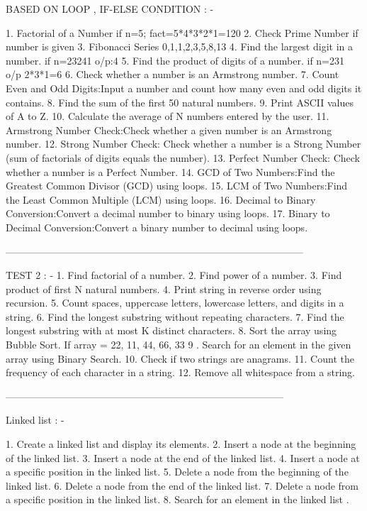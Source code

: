  BASED ON  LOOP , IF-ELSE CONDITION  : -
 
1.  Factorial of a Number if n=5;  fact=5*4*3*2*1=120
2.  Check Prime Number if number is given
3.  Fibonacci Series 0,1,1,2,3,5,8,13
4.  Find the largest digit in a number.   if n=23241   o/p:4
5.  Find the product of digits of a number. if n=231 o/p 2*3*1=6 
6.  Check whether a number is an Armstrong number.
7.  Count Even and Odd Digits:Input a number and count how many even and odd digits it contains.
8.  Find the sum of the first 50 natural numbers.
9.  Print ASCII values of A to Z.
10. Calculate the average of N numbers entered by the user.
11. Armstrong Number Check:Check whether a given number is an Armstrong number.
12. Strong Number Check: Check whether a number is a Strong Number (sum of factorials of digits equals the number).
13. Perfect Number Check: Check whether a number is a Perfect Number.
14. GCD of Two Numbers:Find the Greatest Common Divisor (GCD) using loops.
15. LCM of Two Numbers:Find the Least Common Multiple (LCM) using loops.
16. Decimal to Binary Conversion:Convert a decimal number to binary using loops.
17. Binary to Decimal Conversion:Convert a binary number to decimal using loops.

------------------------------------------------------------------------------------------


TEST 2 : -
1.  Find factorial of a number.
2.  Find power of a number.
3.  Find product of first N natural numbers.
4.  Print string in reverse order using recursion.
5.  Count spaces, uppercase letters, lowercase letters, and digits in a string.
6.  Find the longest substring without repeating characters.
7.  Find the longest substring with at most K distinct characters.
8.  Sort the array using Bubble Sort.   If array = {22, 11, 44, 66, 33}
9 . Search for an element in the given array using Binary Search.
10. Check if two strings are anagrams.
11. Count the frequency of each character in a string.
12. Remove all whitespace from a string.

------------------------------------------------------------------------------------

Linked list : -

1. Create a linked list and display its elements.
2. Insert a node at the beginning of the linked list.
3. Insert a node at the end of the linked list.
4. Insert a node at a specific position in the linked list.
5. Delete a node from the beginning of the linked list.
6. Delete a node from the end of the linked list.
7. Delete a node from a specific position in the linked list.
8. Search for an element in the linked list .









